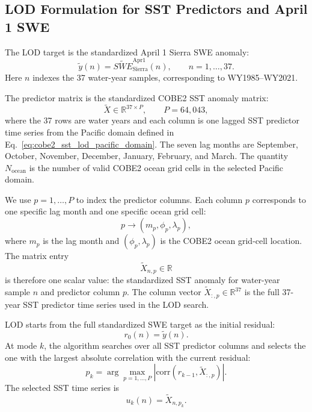 \documentclass[11pt]{article}
\begin{document}
\subsection{LOD Formulation for SST Predictors and April 1 SWE}
\label{subsec:cobe2_swe_lod_formulation}

The LOD target is the standardized April 1 Sierra SWE anomaly:
\begin{equation}
\widetilde{y}(n)
=
\widetilde{SWE}_{\mathrm{Sierra}}^{\mathrm{Apr1}}(n),
\qquad
n=1,\ldots,37.
\label{eq:lod_target_definition}
\end{equation}
Here $n$ indexes the 37 water-year samples, corresponding to WY1985--WY2021.

The predictor matrix is the standardized COBE2 SST anomaly matrix:
\begin{equation}
\widetilde{X} \in \mathbb{R}^{37\times P},
\qquad
P = 64{,}043,
\label{eq:lod_predictor_dimension}
\end{equation}
where the 37 rows are water years and each column is one lagged SST predictor time series from the
Pacific domain defined in Eq.~\eqref{eq:cobe2_sst_lod_pacific_domain}. The seven lag months are
September, October, November, December, January, February, and March. The quantity
$N_{\mathrm{ocean}}$ is the number of valid COBE2 ocean grid cells in the selected Pacific domain.

We use $p=1,\ldots,P$ to index the predictor columns. Each column $p$ corresponds to one
specific lag month and one specific ocean grid cell:
\begin{equation}
p \longrightarrow (m_p,\phi_p,\lambda_p),
\label{eq:lod_predictor_column_mapping}
\end{equation}
where $m_p$ is the lag month and $(\phi_p,\lambda_p)$ is the COBE2 ocean grid-cell location.
The matrix entry
\begin{equation}
\widetilde{X}_{n,p}
\in \mathbb{R}
\label{eq:lod_predictor_entry}
\end{equation}
is therefore one scalar value: the standardized SST anomaly for water-year sample $n$ and
predictor column $p$. The column vector $\widetilde{X}_{:,p}\in\mathbb{R}^{37}$ is the full
37-year SST predictor time series used in the LOD search.

LOD starts from the full standardized SWE target as the initial residual:
\begin{equation}
r_0(n)=\widetilde{y}(n).
\label{eq:lod_initial_residual}
\end{equation}
At mode $k$, the algorithm searches over all SST predictor columns and selects the one with the
largest absolute correlation with the current residual:
\begin{equation}
p_k
=
\arg\max_{p=1,\ldots,P}
\left|
\mathrm{corr}\left(r_{k-1},\widetilde{X}_{:,p}\right)
\right|.
\label{eq:lod_mode_selection}
\end{equation}
The selected SST time series is
\begin{equation}
u_k(n)=\widetilde{X}_{n,p_k}.
\label{eq:lod_selected_candidate}
\end{equation}
\end{document}
